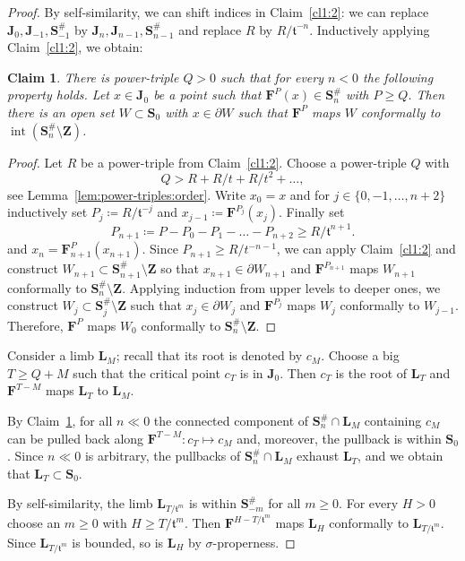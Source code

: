 \documentclass{amsart}
\newcommand{\1}{{\mathbb 1 }}
\newcommand\intr{\operatorname{int}}
\newcommand{\bF}{{\mathbf F}}
\newcommand{\bZ}{{\mathbf Z}}
\newcommand{\bL}{{\mathbf L}}
\newcommand{\bJ}{{\mathbf J}}
\newcommand{\bS}{{\mathbf S}}
\renewcommand{\tt}{\mathfrak{t}}
\newtheorem{claim}{Claim}
\theoremstyle{remark}
\numberwithin{equation}{section}
\theoremstyle{definition}
\theoremstyle{nonumberbreak}
\begin{document}
\begin{proof}
By self-similarity, we can shift indices in Claim~\ref{cl1:2}: we can replace $\bJ_0, \bJ_{-1},\bS^\#_{-1}$ by $\bJ_n, \bJ_{n-1},\bS^\#_{n-1}$ and replace $R$ by $R/\tt^{-n}$. Inductively applying Claim~\ref{cl1:2}, we obtain:
\begin{claim}
\label{cl1:3}
There is power-triple $Q> 0$ such that for every $n<0$ the following property holds. Let $x\in \bJ_0$ be a point such that $\bF^P(x)\in \bS_{n}^\#$ with $P\ge Q$. Then there is an open set $W\subset \bS_{0}$ with $x\in \partial W$ such that $\bF^P$ maps $ W$ conformally to $\intr\left(\bS_{n}^\#\setminus \bZ\right)$.
\end{claim} 
\begin{proof}
Let $R$ be a power-triple from Claim~\ref{cl1:2}. Choose a power-triple $Q$ with
\[Q> R+ R /t+ R /t^2+\dots, \]
see Lemma~\ref{lem:power-triples:order}. Write $x_0=x$ and for $j\in \{0,-1,\dots, n+2\}$ inductively set $P_j\coloneqq R/\tt^{-j}$ and $x_{j-1}\coloneqq \bF^{P_j}(x_j)$. Finally set 
\[P_{n+1}\coloneqq P-P_0-P_1-\dots -P_{n+2}\ge R/\tt^{n+1}.\]
and $x_n=\bF^P_{n+1}(x_{n+1})$. Since $P_{n+1}\ge R/t^{-n-1}$, we can apply Claim~\ref{cl1:2} and construct $W_{n+1}\subset \bS_{n+1}^{\#}\setminus \bZ$ so that $x_{n+1} \in \partial W_{n+1}$ and $\bF^{P_{n+1}}$ maps $W_{n+1}$ 
conformally to $\bS_{n}^{\#}\setminus \bZ$. Applying induction from upper levels to deeper ones, we construct $W_j\subset \bS_{j}^{\#}\setminus \bZ$ such that $x_{j} \in \partial W_{j}$ and 
$\bF^{P_{j}}$ maps $W_{j}$ conformally to $W_{j-1}$. Therefore, $\bF^P$ maps $W_0$ conformally to $\bS_{n}^{\#}\setminus \bZ$.
\end{proof}


Consider a limb $\bL_M$; recall that its root is denoted by $c_M$. Choose a big $T\ge Q+M $ such that the critical point $c_T$ is in $\bJ_0$. Then $c_T$ is the root of $\bL_T$ and $\bF^{T-M}$ maps $\bL_T$ to $\bL_M$.

By Claim~\ref{cl1:3}, for all $n\ll 0$ the connected component of $\bS_n^{\#}\cap \bL_M$ containing $c_M$ can be pulled back along ${\bF^{T-M}\colon c_T \mapsto c_M}$ and, moreover, the pullback is within $\bS_0$. Since $n\ll 0$ is arbitrary, the pullbacks of $\bS_n^{\#}\cap \bL_M$ exhaust $\bL_T$, and we obtain that $\bL_T\subset \bS_0$.

By self-similarity, the limb $\bL_{T/\tt^{m}}$ is within $\bS_{-m}^\#$ for all $m\ge 0$. For every $H> 0$ choose an $m\ge 0$ with $H\ge T/\tt^{m}$. Then  $\bF^{H-T/\tt^m}$ maps $\bL_H$ conformally to $\bL_{T/\tt^{m}}$. Since $\bL_{T/\tt^{m}}$ is bounded, so is $\bL_H$ by $\sigma$-properness.
\end{proof}
\end{document}
